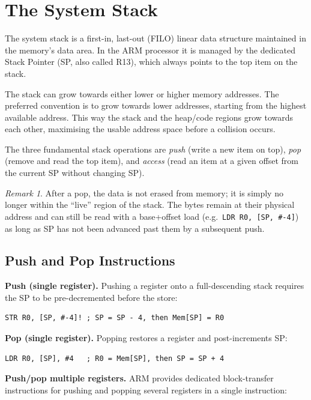\documentclass[11pt, a4paper, notitlepage]{report}
\theoremstyle{definition}
\theoremstyle{remark}
\newtheorem{remark}[theorem]{Remark}
\theoremstyle{definition}
\begin{document}
\section{The System Stack}
\label{sec:push-pop}

The system stack is a first-in, last-out (FILO) linear data structure maintained in the memory's data area. In the ARM processor it is managed by the dedicated Stack Pointer (SP, also called R13), which always points to the top item on the stack.

The stack can grow towards either lower or higher memory addresses. The preferred convention is to grow towards lower addresses, starting from the highest available address. This way the stack and the heap/code regions grow towards each other, maximising the usable address space before a collision occurs.

The three fundamental stack operations are \emph{push} (write a new item on top), \emph{pop} (remove and read the top item), and \emph{access} (read an item at a given offset from the current SP without changing SP).

\begin{remark}
After a pop, the data is not erased from memory; it is simply no longer within the ``live'' region of the stack. The bytes remain at their physical address and can still be read with a base+offset load (e.g.\ \texttt{LDR R0, [SP, \#-4]}) as long as SP has not been advanced past them by a subsequent push.
\end{remark}

\subsection{Push and Pop Instructions}

\textbf{Push (single register).} Pushing a register onto a full-descending stack requires the SP to be pre-decremented before the store:

\begin{lstlisting}
STR R0, [SP, #-4]! ; SP = SP - 4, then Mem[SP] = R0
\end{lstlisting}

\textbf{Pop (single register).} Popping restores a register and post-increments SP:

\begin{lstlisting}
LDR R0, [SP], #4   ; R0 = Mem[SP], then SP = SP + 4
\end{lstlisting}

\textbf{Push/pop multiple registers.} ARM provides dedicated block-transfer instructions for pushing and popping several registers in a single instruction:
\end{document}

